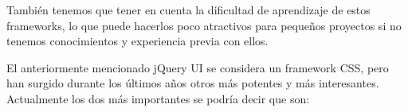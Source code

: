 
También tenemos que tener en cuenta la dificultad de aprendizaje de estos frameworks, lo que puede hacerlos poco atractivos para pequeños proyectos si no tenemos conocimientos y experiencia previa con ellos.

El anteriormente mencionado jQuery UI se considera un framework \gls{CSS}, pero han surgido durante los últimos años otros más potentes y más interesantes. Actualmente los dos más importantes se podría decir que son:

